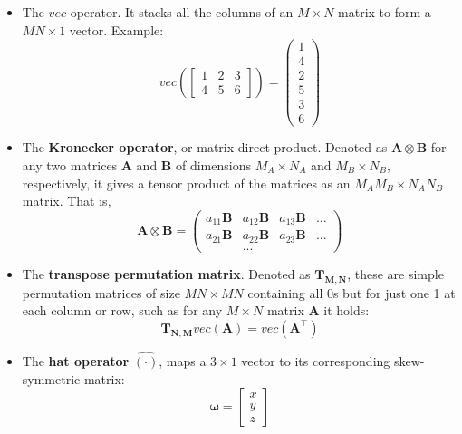 \documentclass[a4paper,11pt]{report}
\begin{document}
\begin{itemize}
\item{The $vec$ operator. It stacks all the columns of an $M \times N$ matrix to form a $MN\times 1$ vector.
Example:
\begin{equation}
  vec\left( \left[
    \begin{array}{ccc}
      1 & 2 & 3 \\
      4 & 5 & 6
    \end{array}
 \right] \right) =
\left(
\begin{array}{c}
1 \\ 4 \\ 2 \\ 5 \\ 3 \\ 6
\end{array}
\right)
\end{equation}
}
\item{The \textbf{Kronecker operator}, or matrix direct product.
Denoted as $\mathbf{A} \otimes \mathbf{B}$ for any two matrices
$\mathbf{A}$ and $\mathbf{B}$ of dimensions $M_A \times N_A$
and $M_B \times N_B$, respectively,
it gives a tensor product of the matrices as an $M_AM_B \times N_A N_B$ matrix.
That is,
\begin{equation}
 \mathbf{A} \otimes \mathbf{B}
 =
\left(
\begin{array}{cccc}
a_{11} \mathbf{B}  & a_{12} \mathbf{B} & a_{13} \mathbf{B}  & ... \\
a_{21} \mathbf{B}  & a_{22} \mathbf{B} & a_{23} \mathbf{B}  & ... \\
 & ... &
\end{array}
\right)
\end{equation}
}
\item{The \textbf{transpose permutation matrix}. Denoted as $\mathbf{T_{M,N}}$,
these are simple permutation matrices of size $MN \times MN$ containing all 0s
but for just one 1 at each column or row,
such as for any $M \times N$ matrix $\mathbf{A}$ it holds:
\begin{equation}
\mathbf{T_{N,M}} vec(\mathbf{A}) = vec(\mathbf{A}^\top)
\end{equation}
}
\item{The \textbf{hat operator} $\hat{(\cdot)}$, maps a $3\times 1$ vector to its corresponding skew-symmetric matrix:
	\begin{equation}
	\label{eq:skew}
	\bm{\omega} = \left[ \begin{array}{c} x \\ y \\z \end{array} \right]

\end{equation}}
\end{itemize}
\end{document}
